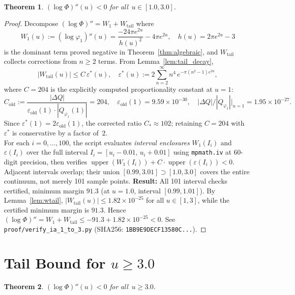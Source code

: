 \documentclass[11pt]{article}
\newtheorem{theorem}{Theorem}
\theoremstyle{definition}
\theoremstyle{remark}
\begin{document}
\begin{theorem}\label{thm:extended}
$(\log\Phi)''(u) < 0$ for all~$u \in [1.0, 3.0]$.
\end{theorem}

\begin{proof}
Decompose $(\log\Phi)'' = W_1 + W_{\mathrm{tail}}$ where
\[
W_1(u) := (\log\varphi_1)''(u) = \frac{-24\pi e^{2u}}{h(u)^2} - 4\pi e^{2u},
\quad h(u) = 2\pi e^{2u} - 3
\]
is the dominant term proved negative in Theorem~\ref{thm:algebraic}, and
$W_{\mathrm{tail}}$ collects corrections from $n \geq 2$ terms. From
Lemma~\ref{lem:tail_decay},
\[
|W_{\mathrm{tail}}(u)| \leq C\,\varepsilon^*(u), \quad \varepsilon^*(u) := 2\sum_{n=2}^{\infty} n^4\,e^{-\pi(n^2-1)e^{2u}},
\]
where $C = 204$ is the explicitly computed proportionality constant at $u = 1$:
\[
C_{\mathrm{old}} := \frac{|\Delta Q|}{\varepsilon_{\mathrm{old}}(1)\cdot|Q_{\varphi_1}(1)|} = 204,
\quad
\varepsilon_{\mathrm{old}}(1) = 9.59\times 10^{-30},
\quad |\Delta Q|/|Q_{\varphi_1}|\big|_{u=1} = 1.95\times 10^{-27}.
\]
Since $\varepsilon^*(1) = 2\varepsilon_{\mathrm{old}}(1)$, the corrected ratio $C_*\approx102$; retaining $C=204$ with $\varepsilon^*$ is conservative by a factor of~$2$.
\[
\]
For each $i = 0,\ldots,100$, the script evaluates \emph{interval enclosures}
$W_1(I_i)$ and $\varepsilon(I_i)$ over the full interval $I_i = [u_i - 0.01,\, u_i + 0.01]$
using \texttt{mpmath.iv} at 60-digit precision, then verifies
$\operatorname{upper}(W_1(I_i)) + C\cdot\operatorname{upper}(\varepsilon(I_i)) < 0$.
Adjacent intervals overlap; their union $[0.99, 3.01] \supset [1.0, 3.0]$ covers the
entire continuum, not merely 101 sample points.
\newline
\textbf{Result:} All 101 interval checks certified, minimum margin $91.3$ (at $u = 1.0$,
interval $[0.99, 1.01]$).  By Lemma~\ref{lem:wtail}, $|W_{\mathrm{tail}}(u)| \leq 1.82\times 10^{-25}$
for all $u \in [1, 3]$, while the certified minimum margin is $91.3$.  Hence
$(\log\Phi)'' = W_1 + W_{\mathrm{tail}} \leq -91.3 + 1.82\times 10^{-25} < 0$.
See \texttt{proof/verify\_ia\_1\_to\_3.py} (SHA256: \texttt{1BB9E9DECF13580C...}).
\end{proof}

\section{Tail Bound for $u \geq 3.0$}
\label{sec:tailbound}

\begin{theorem}\label{thm:perturbation_tail}
$(\log\Phi)''(u) < 0$ for all~$u \geq 3.0$.
\end{theorem}
\end{document}
